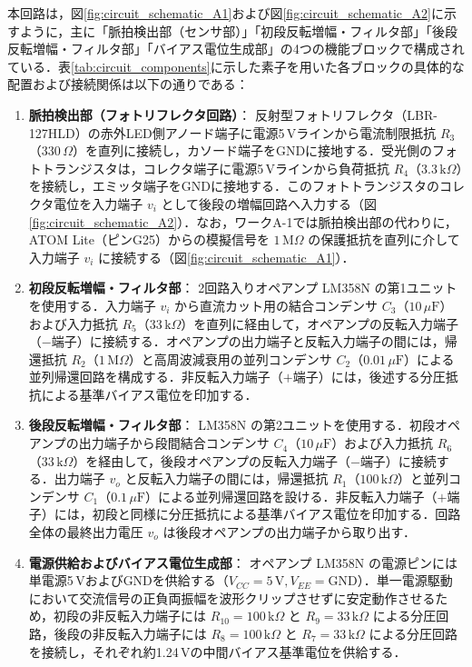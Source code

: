 本回路は，図\ref{fig:circuit_schematic_A1}および図\ref{fig:circuit_schematic_A2}に示すように，主に「脈拍検出部（センサ部）」「初段反転増幅・フィルタ部」「後段反転増幅・フィルタ部」「バイアス電位生成部」の4つの機能ブロックで構成されている．表\ref{tab:circuit_components}に示した素子を用いた各ブロックの具体的な配置および接続関係は以下の通りである：
\begin{enumerate}
  \item \textbf{脈拍検出部（フォトリフレクタ回路）}：
        反射型フォトリフレクタ（LBR-127HLD）の赤外LED側アノード端子に電源5\,Vラインから電流制限抵抗 $R_3$（$330\,\Omega$）を直列に接続し，カソード端子をGNDに接地する．受光側のフォトトランジスタは，コレクタ端子に電源5\,Vラインから負荷抵抗 $R_4$（$3.3\,\mathrm{k}\Omega$）を接続し，エミッタ端子をGNDに接地する．このフォトトランジスタのコレクタ電位を入力端子 $v_i$ として後段の増幅回路へ入力する（図\ref{fig:circuit_schematic_A2}）．なお，ワークA-1では脈拍検出部の代わりに，ATOM Lite（ピンG25）からの模擬信号を $1\,\mathrm{M}\Omega$ の保護抵抗を直列に介して入力端子 $v_i$ に接続する（図\ref{fig:circuit_schematic_A1}）．

  \item \textbf{初段反転増幅・フィルタ部}：
        2回路入りオペアンプ LM358N の第1ユニットを使用する．入力端子 $v_i$ から直流カット用の結合コンデンサ $C_3$（$10\,\mu\mathrm{F}$）および入力抵抗 $R_5$（$33\,\mathrm{k}\Omega$）を直列に経由して，オペアンプの反転入力端子（$-$端子）に接続する．オペアンプの出力端子と反転入力端子の間には，帰還抵抗 $R_2$（$1\,\mathrm{M}\Omega$）と高周波減衰用の並列コンデンサ $C_2$（$0.01\,\mu\mathrm{F}$）による並列帰還回路を構成する．非反転入力端子（$+$端子）には，後述する分圧抵抗による基準バイアス電位を印加する．

  \item \textbf{後段反転増幅・フィルタ部}：
        LM358N の第2ユニットを使用する．初段オペアンプの出力端子から段間結合コンデンサ $C_4$（$10\,\mu\mathrm{F}$）および入力抵抗 $R_6$（$33\,\mathrm{k}\Omega$）を経由して，後段オペアンプの反転入力端子（$-$端子）に接続する．出力端子 $v_o$ と反転入力端子の間には，帰還抵抗 $R_1$（$100\,\mathrm{k}\Omega$）と並列コンデンサ $C_1$（$0.1\,\mu\mathrm{F}$）による並列帰還回路を設ける．非反転入力端子（$+$端子）には，初段と同様に分圧抵抗による基準バイアス電位を印加する．回路全体の最終出力電圧 $v_o$ は後段オペアンプの出力端子から取り出す．

  \item \textbf{電源供給およびバイアス電位生成部}：
        オペアンプ LM358N の電源ピンには単電源5\,VおよびGNDを供給する（$V_{CC} = 5\,\mathrm{V}, V_{EE} = \mathrm{GND}$）．単一電源駆動において交流信号の正負両振幅を波形クリップさせずに安定動作させるため，初段の非反転入力端子には $R_{10} = 100\,\mathrm{k}\Omega$ と $R_9 = 33\,\mathrm{k}\Omega$ による分圧回路，後段の非反転入力端子には $R_8 = 100\,\mathrm{k}\Omega$ と $R_7 = 33\,\mathrm{k}\Omega$ による分圧回路を接続し，それぞれ約1.24\,Vの中間バイアス基準電位を供給する．
\end{enumerate}


